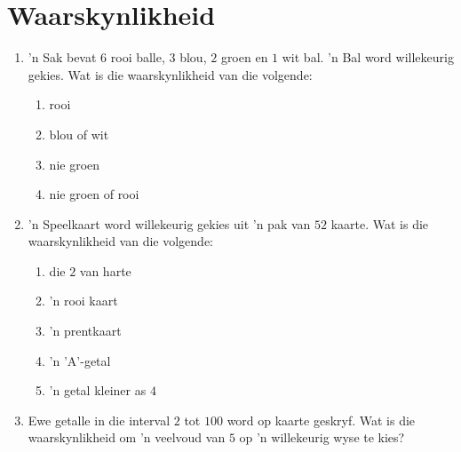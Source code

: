 \chapter{Waarskynlikheid}

\begin{exercises}{}
{
  \begin{enumerate}[itemsep=5pt, label=\textbf{\arabic*}.]
  \item 'n Sak bevat $6$ rooi balle, $3$ blou, $2$ groen en $1$ wit
    bal. 'n Bal word willekeurig gekies. Wat is die waarskynlikheid van die volgende:
    \begin{enumerate}[noitemsep, label=\textbf{(\alph*)} ]
    \item rooi
    \item blou of wit
    \item nie groen
    \item nie groen of rooi
    \end{enumerate}
  \item 'n Speelkaart word willekeurig gekies uit 'n pak van $52$ kaarte. Wat is die waarskynlikheid van die volgende:
    \begin{enumerate}[noitemsep, label=\textbf{(\alph*)} ]

    \item die $2$ van harte
    \item 'n rooi kaart
    \item 'n prentkaart
    \item 'n 'A'-getal
    \item 'n getal kleiner as $4$
    \end{enumerate}

  \item Ewe getalle in die interval $2$ tot $100$ word op kaarte geskryf. Wat is
    die waarskynlikheid om 'n veelvoud van $5$ op 'n willekeurig wyse te kies?
  \end{enumerate}
}
\end{exercises}



